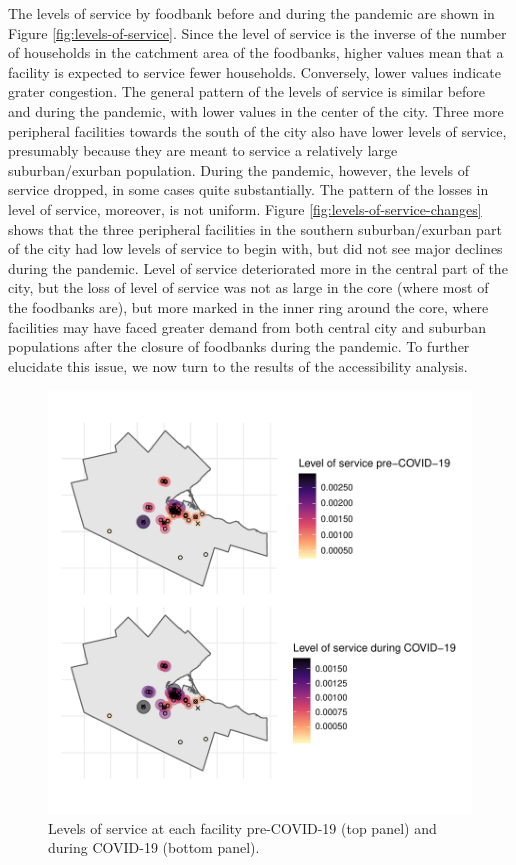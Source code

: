 \documentclass[]{elsarticle} %
\begin{document}
The levels of service by foodbank before and during the pandemic are
shown in Figure \ref{fig:levels-of-service}. Since the level of service
is the inverse of the number of households in the catchment area of the
foodbanks, higher values mean that a facility is expected to service
fewer households. Conversely, lower values indicate grater congestion.
The general pattern of the levels of service is similar before and
during the pandemic, with lower values in the center of the city. Three
more peripheral facilities towards the south of the city also have lower
levels of service, presumably because they are meant to service a
relatively large suburban/exurban population. During the pandemic,
however, the levels of service dropped, in some cases quite
substantially. The pattern of the losses in level of service, moreover,
is not uniform. Figure \ref{fig:levels-of-service-changes} shows that
the three peripheral facilities in the southern suburban/exurban part of
the city had low levels of service to begin with, but did not see major
declines during the pandemic. Level of service deteriorated more in the
central part of the city, but the loss of level of service was not as
large in the core (where most of the foodbanks are), but more marked in
the inner ring around the core, where facilities may have faced greater
demand from both central city and suburban populations after the closure
of foodbanks during the pandemic. To further elucidate this issue, we
now turn to the results of the accessibility analysis.

\begin{figure}
\includegraphics[width=1\linewidth]{Accessibility-Foodbanks-Hamilton_files/figure-latex/plot-levels-of-service-1} \caption{\label{fig:levels-of-service}Levels of service at each facility pre-COVID-19 (top panel) and during COVID-19 (bottom panel).}\label{fig:plot-levels-of-service}
\end{figure}
\end{document}
